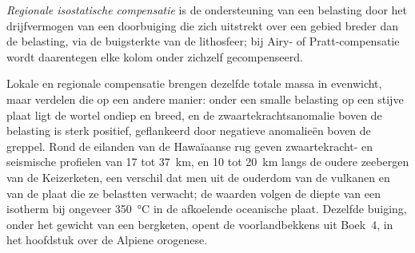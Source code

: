 \begin{definition}\label{def:b3:gravity-geodesy:regional}
\emph{Regionale isostatische compensatie}
is de ondersteuning van een belasting door het drijfvermogen van een doorbuiging die zich uitstrekt over een gebied
breder dan de belasting, via de buigsterkte van de lithosfeer; bij Airy- of
Pratt-compensatie wordt daarentegen elke kolom onder zichzelf gecompenseerd.
\end{definition}

Lokale en regionale compensatie brengen dezelfde totale massa in evenwicht, maar verdelen die
op een andere manier: onder een smalle belasting op een stijve plaat ligt de wortel ondiep en breed,
en de zwaartekrachtsanomalie boven de belasting is sterk positief, geflankeerd door negatieve
anomalieën boven de greppel. Rond de eilanden van de Hawaïaanse rug geven zwaartekracht- en
seismische profielen  van 17 tot \qty{37}{km}, en
10 tot \qty{20}{km} langs de oudere zeebergen van de Keizerketen, een verschil dat men
uit de ouderdom van de vulkanen en van de plaat die ze belastten verwacht; de waarden
volgen de diepte van een isotherm bij ongeveer
\qty{350}{\degreeCelsius} in de afkoelende oceanische plaat.
Dezelfde buiging, onder het gewicht van een bergketen, opent de voorlandbekkens uit Boek~4,
in het hoofdstuk over de Alpiene orogenese.

